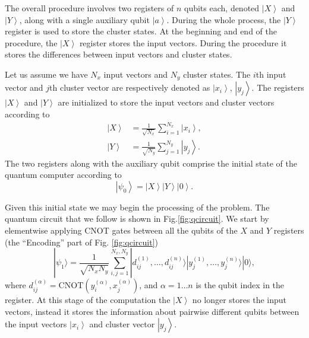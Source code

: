 \documentclass[pra,showkeys,twocolumn,showpacs]{revtex4-1}
\begin{document}
The overall procedure involves two registers of $n$ qubits each, denoted $\left| X \right\rangle$ and $\left| Y \right\rangle$, along with a single auxiliary qubit $\left| a \right\rangle$.
During the whole process, the $\left| Y \right\rangle$ register is used to store the cluster states.
At the beginning and end of the procedure, the $\left| X \right\rangle$ register stores the input vectors.
During the procedure it stores the differences between input vectors and cluster states.

Let us assume we have $N_x$ input vectors and $N_y$ cluster states.
The $i$th input vector and $j$th cluster vector are respectively denoted as $\left| x_i \right\rangle$, $\left| y_j \right\rangle$.
The registers $\left| X \right\rangle$ and $\left| Y \right\rangle$ are initialized to store the input vectors and cluster vectors according to
%
\begin{align}
    \label{eq:encodnig}
    \left| X \right\rangle  & = \frac{1}{\sqrt{N_x}} \sum\limits_{i=1}^{N_x} \left| x_i \right\rangle,  \\
    \left| Y \right\rangle&  = \frac{1}{\sqrt{N_y}} \sum\limits_{j=1}^{N_y} \left| y_j \right\rangle .
\end{align}
%
The two registers along with the auxiliary qubit comprise the initial state of the quantum computer according to
%
\begin{equation}
    \label{eq:initial_state}
	\left| \psi_0 \right\rangle =
    \left| X \right\rangle
    \left| Y \right\rangle
    \left| 0 \right\rangle.
\end{equation}

Given this initial state we may begin the processing of the problem.  The quantum circuit that we follow is shown in Fig.\ref{fig:qcircuit}. We start by elementwise applying CNOT gates between all the qubits of the $X$ and $Y$ registers (the ``Encoding'' part of Fig. \ref{fig:qcircuit})
%
\begin{equation}
    | \psi_1 \rangle  =
    \frac{1}{\sqrt{N_x N_y}} \sum_{i, j=1}^{N_x,N_y}
    | d^{(1)}_{ij}, \dots, d^{(n)}_{ij} \rangle
    | y^{(1)}_j, \dots, y^{(n)}_j \rangle
    | 0 \rangle ,
\end{equation}
%
where $d^{(\alpha)}_{ij} = \mathrm{CNOT}(y^{(\alpha)}_i, x^{(\alpha)}_j)$, and $\alpha = 1 \dots n$  is the qubit index in the register.
At this stage of the computation the $\left| X \right\rangle$ no longer stores the input vectors,
instead it stores the information about pairwise different qubits between the input vectors $\left| x_i \right\rangle$ and cluster vector $\left| y_j \right\rangle$.
\end{document}

